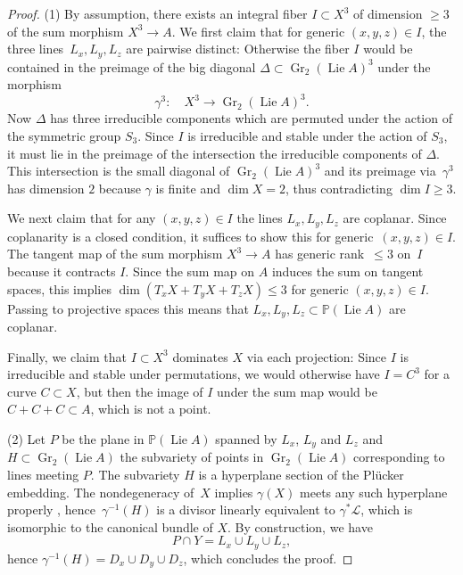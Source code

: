 \documentclass[a4paper]{amsart}
\newcommand{\bbP}{\mathbb{P}}
\newcommand{\cL}{\mathcal{L}}
\newcommand{\too}{\longrightarrow}
\DeclareMathOperator{\Gr}{Gr}
\DeclareMathOperator{\Lie}{Lie}
\renewcommand{\le}{\leqslant}
\renewcommand{\ge}{\geqslant}
\theoremstyle{plain}
\theoremstyle{definition}
\numberwithin{equation}{section}
\begin{document}
\begin{proof} 
(1) By assumption, there exists an integral fiber $I\subset X^3$ of dimension $\ge 3$ of the sum morphism $X^3 \to A$. We first claim that for generic $(x, y, z)\in I$, the three lines~$L_x, L_y,L_z$ are pairwise distinct: Otherwise the fiber $I$ would be contained in the preimage of the big diagonal $\Delta \subset \Gr_2(\Lie A)^3$ under the morphism
%
\[ \gamma^3\colon\quad X^3 \too \Gr_2(\Lie A)^3 .\]
%
Now $\Delta$ has three irreducible components which are permuted under the action of the symmetric group $S_3$. Since $I$ is irreducible and stable under the action of $S_3$, it must lie in the preimage of the intersection the irreducible components of $\Delta$. This intersection is the small diagonal of $\Gr_2(\Lie A)^3$ and its preimage via~$\gamma^3$ has dimension $2$ because $\gamma$ is finite and $\dim X = 2$, thus contradicting $\dim I \ge 3$. \medskip

We next claim that for any $(x,y,z)\in I$ the lines $L_x, L_y, L_z$ are coplanar.  Since coplanarity is a closed condition, it suffices to show this for generic~$(x,y,z)\in I$. The tangent map of the sum morphism $X^3 \to A$ has generic rank~$\le 3$ on~$I$ because it contracts $I$. Since the sum map on $A$ induces the sum on tangent spaces, this implies 
$ \dim (T_x X + T_y X + T_z X ) \le 3$ for generic $(x,y, z) \in I$.
Passing to projective spaces this means that $L_x,L_y,L_z \subset \bbP(\Lie A)$ are coplanar.\medskip

Finally, we claim that $I \subset X^3$ dominates $X$ via each projection: Since $I$ is irreducible and stable under permutations, we would otherwise have 
$I = C^3$ for a curve $C \subset X$, but then the image of $I$ under the sum map would be $C+C+C \subset A$, which is not a point.

\medskip 

(2) Let $P$ be the plane in $\bbP(\Lie A)$ spanned by $L_x$, $L_y$ and $L_z$ and $H \subset \Gr_2(\Lie A)$ the subvariety of points in $\Gr_2(\Lie A)$ corresponding to lines meeting $P$. The subvariety $H$ is a hyperplane section of the Pl\"ucker embedding. The nondegeneracy of~$X$ implies $\gamma(X)$ meets any such hyperplane properly \cite[lemma II.12]{Ran}, hence~$\gamma^{-1}(H)$ is a divisor linearly equivalent to $\gamma^\ast \cL$, which is isomorphic to the canonical bundle of $X$. By construction, we have
\[ P \cap Y = L_x \cup L_y \cup L_z,\]
hence $\gamma^{-1}(H) = D_x \cup D_y \cup D_z$, which concludes the proof.
\end{proof}
\end{document}

